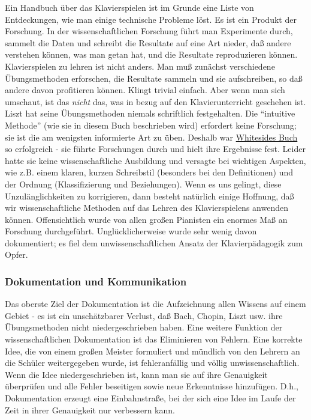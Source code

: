Ein Handbuch über das Klavierspielen ist im Grunde eine Liste von Entdeckungen, wie man einige technische Probleme löst.
Es ist ein Produkt der Forschung.
In der wissenschaftlichen Forschung führt man Experimente durch, sammelt die Daten und schreibt die Resultate auf eine Art nieder, daß andere verstehen können, was man getan hat, und die Resultate reproduzieren können.
Klavierspielen zu lehren ist nicht anders.
Man muß zunächst verschiedene Übungsmethoden erforschen, die Resultate sammeln und sie aufschreiben, so daß andere davon profitieren können.
Klingt trivial einfach.
Aber wenn man sich umschaut, ist das \textit{nicht} das, was in bezug auf den Klavierunterricht geschehen ist.
Liszt hat seine Übungsmethoden niemals schriftlich festgehalten.
Die \enquote{intuitive Methode} (wie sie in diesem Buch beschrieben wird) erfordert keine Forschung; sie ist die am wenigsten informierte Art zu üben.
Deshalb war \hyperref[Whiteside]{Whitesides Buch} so erfolgreich - sie führte Forschungen durch und hielt ihre Ergebnisse fest.
Leider hatte sie keine wissenschaftliche Ausbildung und versagte bei wichtigen Aspekten, wie z.B. einem klaren, kurzen Schreibstil (besonders bei den Definitionen) und der Ordnung (Klassifizierung und Beziehungen).
Wenn es uns gelingt, diese Unzulänglichkeiten zu korrigieren, dann besteht natürlich einige Hoffnung, daß wir wissenschaftliche Methoden auf das Lehren des Klavierspielens anwenden können.
Offensichtlich wurde von allen großen Pianisten ein enormes Maß an Forschung durchgeführt.
Unglücklicherweise wurde sehr wenig davon dokumentiert; es fiel dem unwissenschaftlichen Ansatz der Klavierpädagogik zum Opfer.


\subsubsection{Dokumentation und Kommunikation}
\label{c3_3d}

Das oberste Ziel der Dokumentation ist die Aufzeichnung allen Wissens auf einem Gebiet - es ist ein unschätzbarer Verlust, daß Bach, Chopin, Liszt usw. ihre Übungsmethoden nicht niedergeschrieben haben.
Eine weitere Funktion der wissenschaftlichen Dokumentation ist das Eliminieren von Fehlern.
Eine korrekte Idee, die von einem großen Meister formuliert und mündlich von den Lehrern an die Schüler weitergegeben wurde, ist fehleranfällig und völlig unwissenschaftlich.
Wenn die Idee niedergeschrieben ist, kann man sie auf ihre Genauigkeit überprüfen und alle Fehler beseitigen sowie neue Erkenntnisse hinzufügen.
D.h., Dokumentation erzeugt eine Einbahnstraße, bei der sich eine Idee im Laufe der Zeit in ihrer Genauigkeit nur verbessern kann.

